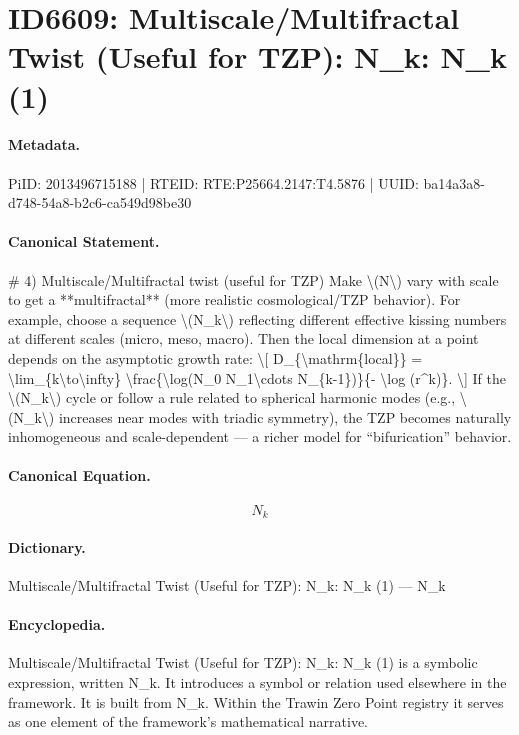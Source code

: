 \section*{ID6609: Multiscale/Multifractal Twist (Useful for TZP): N\_k: N\_k (1)}
\paragraph{Metadata.}
PiID: 2013496715188 | RTEID: RTE:P25664.2147:T4.5876 | UUID: ba14a3a8-d748-54a8-b2c6-ca549d98be30

\paragraph{Canonical Statement.}
\# 4) Multiscale/Multifractal twist (useful for TZP) Make \textbackslash{}(N\textbackslash{}) vary with scale to get a **multifractal** (more realistic cosmological/TZP behavior). For example, choose a sequence \textbackslash{}(N\_k\textbackslash{}) reflecting different effective kissing numbers at different scales (micro, meso, macro). Then the local dimension at a point depends on the asymptotic growth rate: \textbackslash{}[ D\_\{\textbackslash{}mathrm\{local\}\} = \textbackslash{}lim\_\{k\textbackslash{}to\textbackslash{}infty\} \textbackslash{}frac\{\textbackslash{}log(N\_0 N\_1\textbackslash{}cdots N\_\{k-1\})\}\{- \textbackslash{}log (r\textasciicircum{}k)\}. \textbackslash{}] If the \textbackslash{}(N\_k\textbackslash{}) cycle or follow a rule related to spherical harmonic modes (e.g., \textbackslash{}(N\_k\textbackslash{}) increases near modes with triadic symmetry), the TZP becomes naturally inhomogeneous and scale-dependent — a richer model for “bifurication” behavior.

\paragraph{Canonical Equation.}
\[
N_k
\]

\paragraph{Dictionary.}
Multiscale/Multifractal Twist (Useful for TZP): N\_k: N\_k (1) — N\_k

\paragraph{Encyclopedia.}
Multiscale/Multifractal Twist (Useful for TZP): N\_k: N\_k (1) is a symbolic expression, written N\_k. It introduces a symbol or relation used elsewhere in the framework. It is built from N\_k. Within the Trawin Zero Point registry it serves as one element of the framework's mathematical narrative.
